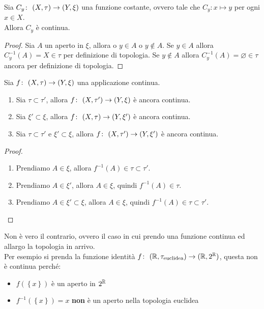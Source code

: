\begin{theorem}
	Sia $C_y \colon\ (X,\tau) \rightarrow (Y,\xi)$ una funzione costante, ovvero tale che $C_y : x \mapsto y$ per ogni $x \in X$. \\ Allora $C_y$ è continua.
\end{theorem}
\begin{proof}
	Sia $A$ un aperto in $\xi$, allora o $y \in A$ o $y \notin A$. Se $y \in A$ allora $C^{-1}_y(A) = X \in \tau$ per definizione di topologia. Se $y \notin A$ allora $C^{-1}_y(A) = \varnothing \in \tau$ ancora per definizione di topologia.
\end{proof}

\begin{theorem}
	Sia $f \colon\ (X,\tau) \rightarrow (Y,\xi)$ una applicazione continua. 
	\begin{enumerate}
		\item Sia $\tau \subset \tau'$, allora $f \colon\ (X,\tau') \rightarrow (Y,\xi)$ è ancora continua.
		\item Sia $\xi' \subset \xi$, allora $f \colon\ (X,\tau) \rightarrow (Y,\xi')$ è ancora continua.
		\item Sia $\tau \subset \tau'$ e $\xi' \subset \xi$, allora $f \colon\ (X,\tau') \rightarrow (Y,\xi')$ è ancora continua.
	\end{enumerate}
\end{theorem}
\begin{proof} \
	\begin{enumerate}
		\item Prendiamo $A \in \xi$, allora $f^{-1}(A) \in \tau \subset \tau'$.
		\item Prendiamo $A \in \xi'$, allora $A \in \xi$, quindi $f^{-1}(A) \in \tau$. 
		\item Prendiamo $A \in \xi' \subset \xi$, allora $A \in \xi$, quindi $f^{-1}(A) \in \tau \subset \tau'$.
	\end{enumerate}
\end{proof}

\begin{remark}
	Non è vero il contrario, ovvero il caso in cui prendo una funzione continua ed allargo la topologia in arrivo. \\ Per esempio si prenda la funzione identità $f \colon\ (\mathbb{R}, \tau_{\text{euclidea}}) \rightarrow (\mathbb{R}, 2^{\mathbb{R}})$, questa non è continua perché:
	\begin{itemize}
		\item $f(\left\{x\right\})$ è un aperto in $2^{\mathbb{R}}$
		\item $f^{-1}(\left\{x\right\}) = x$ \textbf{non} è un aperto nella topologia euclidea
	\end{itemize}
\end{remark}

